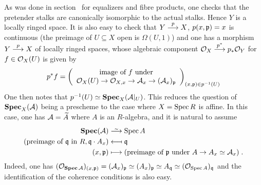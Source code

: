 \documentclass[a4paper,parskip=half,numbers=enddot, DIV=12]{scrreprt}
\begin{document}
As was done in section~ for equalizers and fibre products, one checks that the pretender stalks are canonically isomorphic to the actual stalks. Hence $Y$ is a locally ringed space. It is also easy to check that $Y\morphism[p] X$, $p(x,\mathfrak{p})=x$ is continuous (the preimage of $U\subseteq X$ open is $\Omega(U, 1)$) and one has a morphism $Y\morphism[p] X$ of locally ringed spaces, whose algebraic component $\Oo_X\morphism[p^*]p_*\Oo_Y$ for $f\in\mathcal{O}_X(U)$ is given by 
\begin{align*}
	p^* f=\left(
	\begin{array}{c}
		\text{image of }f\text{ under}\\
		\Oo_X(U) \morphism \Oo_{X,x} \morphism \Aa_x \morphism (\Aa_x)_\pp 
	\end{array}\right)_{(x,\pp)\in p^{-1}(U)}
\end{align*}
One then notes that $p^{-1} (U)\simeq \operatorname{\mathbf{Spec}}_X(\mathcal{A}|_U)$. This reduces the question of $\operatorname{\mathbf{Spec}}_X(\mathcal{A})$ being a prescheme to the case where $X=\operatorname{Spec} R$ is affine. In this case, one has $\Aa= \snake A$ where $A$ is an $R$-algebra, and it is natural to assume 
\begin{align*}
    \SPEC(\Aa)&\isomorphism \Spec A\\
    (\text{preimage of }\qq\text{ in }R, \qq \cdot A_x) &\longmapsfrom \qq\\
    (x,\pp)  &\longmapsto (\text{preimage of }\pp\text{ under } A\to A_x \simeq \Aa_x)\;.
\end{align*}
Indeed, one has $(\mathcal{O}_{\operatorname{\mathbf{Spec}} \mathcal{A}})_{(x,\mathfrak{p})} = (\mathcal{A}_x)_{\mathfrak{p}} \simeq (A_x)_{\mathfrak{p}} \simeq A_{\mathfrak{q}} \simeq (\mathcal{O}_{\operatorname{Spec} A})_{\mathfrak{q}}$ and the identification of the coherence conditions is also easy.
\end{document}
